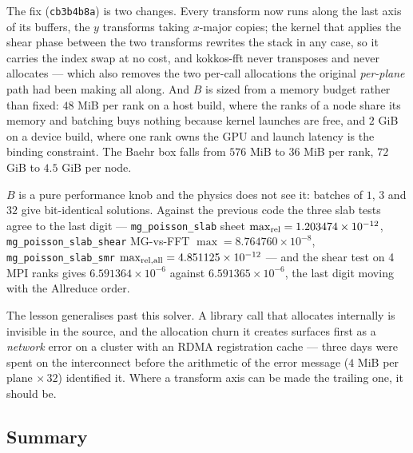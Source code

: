 \documentclass[11pt]{article}
\newcommand{\code}[1]{\texttt{#1}}
\begin{document}
The fix (\code{cb3b4b8a}) is two changes. Every transform now runs along the last axis
of its buffers, the $y$ transforms taking $x$-major copies; the kernel that applies the
shear phase between the two transforms rewrites the stack in any case, so it carries the
index swap at no cost, and kokkos-fft never transposes and never allocates --- which
also removes the two per-call allocations the original \emph{per-plane} path had been
making all along. And $B$ is sized from a memory budget rather than fixed: $48$ MiB per
rank on a host build, where the ranks of a node share its memory and batching buys
nothing because kernel launches are free, and $2$ GiB on a device build, where one rank
owns the GPU and launch latency is the binding constraint. The Baehr box falls from
$576$ MiB to $36$ MiB per rank, $72$ GiB to $4.5$ GiB per node.

$B$ is a pure performance knob and the physics does not see it: batches of $1$, $3$ and
$32$ give bit-identical solutions. Against the previous code the three slab tests agree
to the last digit --- \code{mg\_poisson\_slab} sheet $\max_{\rm rel} = 1.203474\times
10^{-12}$, \code{mg\_poisson\_slab\_shear} MG-vs-FFT $\max = 8.764760\times10^{-8}$,
\code{mg\_poisson\_slab\_smr} $\max_{\rm rel,all} = 4.851125\times10^{-12}$ --- and the
shear test on 4 MPI ranks gives $6.591364\times10^{-6}$ against $6.591365\times10^{-6}$,
the last digit moving with the Allreduce order.

The lesson generalises past this solver. A library call that allocates internally is
invisible in the source, and the allocation churn it creates surfaces first as a
\emph{network} error on a cluster with an RDMA registration cache --- three days were
spent on the interconnect before the arithmetic of the error message ($4$ MiB per plane
$\times\,32$) identified it. Where a transform axis can be made the trailing one, it
should be.

\subsection{Summary}
\end{document}
